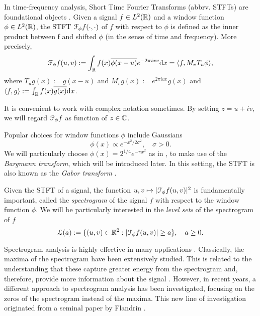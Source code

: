 In time-frequency analysis, Short Time Fourier Transforms (abbrv. STFTs) are foundational objects \cite{TFA_Grochenig, TFA_Flandrin, TFA_Cohen}. 
Given a signal $f\in L^2(\mathbb{R})$ and a window function $\phi \in L^2(\mathbb{R})$, the STFT $\mathcal{F}_\phi f(\cdot,\cdot)$ of $f$ with respect to $\phi$ is defined as the inner product between f and shifted $\phi$ (in the sense of time and frequency). More precisely,
\begin{equation}
    \mathcal{F}_\phi f(u,v) := \int_{\mathbb{R}} f(x) \overline{\phi (x-u)} e^{-2\pi i x v} \mathrm{d} x = \langle f , M_v T_u \phi \rangle,
\end{equation}
where $T_u g (x) := g(x- u)$ and $M_v g(x) := e^{2\pi i v x} g(x) $ and $\langle f,g \rangle := \int_{\mathbb{R}} f(x)\overline{g(x)}\mathrm{d} x$.
\begin{remark}
    It is convenient to work with complex notation sometimes. By setting $z= u + iv$, we will regard $\mathcal{F}_\phi f$ as function of $z\in \mathbb{C}$.
\end{remark}

Popular choices for window functions $\phi$ include Gaussians
\[\phi(x) \propto e^{-x^2/2\sigma^2}, \quad \sigma >0.\]
We will particularly choose  $\phi (x) = 2^{1/4}e^{-\pi x^2}$ as in \cite{BARDENET_Spec,GhoshGAF}, 
to make use of the \emph{Bargmann transform}, which will be introduced later. In this setting, the STFT is also known as the \emph{Gabor transform} \cite{TFA_Grochenig}.

Given the STFT of a signal, the function $u,v\mapsto|\mathcal{F}_\phi f(u,v)|^2$ is  fundamentally important, called the \emph{spectrogram} of the signal $f$ with respect to the window function $\phi$.
We will be particularly interested in the \emph{level sets} of the spectrogram of $f$
\[\mathcal L (a) := \{(u,v) \in \mathbb{R}^2: |\mathcal{F}_\phi f(u,v)| \ge a \}, \quad a\ge 0.\]

Spectrogram analysis is highly effective in many applications \cite{TFA_Grochenig, Spectrogram_Flandrin}. Classically, the maxima of the spectrogram have been extensively studied. This is related to the understanding that these capture greater energy from the spectrogram and, therefore, provide more information about the signal  \cite{TFA_Grochenig, TFA_Flandrin, TFA_Cohen, Flandrin_2018}. However, in recent years, a different approach to spectrogram analysis has been investigated, focusing on the zeros of the spectrogram instead of the maxima. This new line of investigation originated from a seminal paper by Flandrin \cite{Spectrogram_Flandrin}. 


